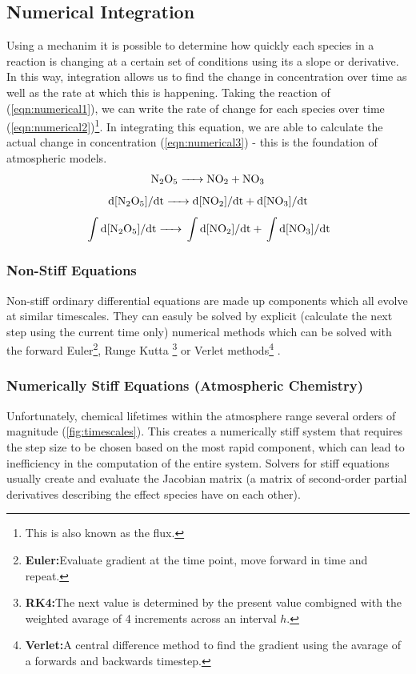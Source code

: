 \subsection{Numerical Integration}
Using a mechanim it is possible to determine how quickly each species in a reaction is changing at a certain set of conditions using its a slope or derivative. In this way, integration allows us to find the change in concentration over time as well as the rate at which this is happening.  Taking the reaction of  (\autoref{eqn:numerical1}), we can write the rate of change for each species over time (\autoref{eqn:numerical2})\footnote{This is also known as the flux.}. In integrating this equation, we are able to calculate the actual change in concentration (\autoref{eqn:numerical3}) - this is the foundation of atmospheric models.
\begin{equation}
\ce{N2O5 ->    NO2} + \ce{NO3}
\label{eqn:numerical1}
\end{equation}
\begin{equation}
\ce{ d[N2O5]/dt ->    d[NO2]/dt} + \ce{d[NO3]/dt}
\label{eqn:numerical2}
\end{equation}
\begin{equation}
\ce{ \int d[N2O5]/dt ->    \int d[NO2]/dt} + \ce{\int d[NO3]/dt}
\label{eqn:numerical3}
\end{equation}
\subsubsection{Non-Stiff Equations}
Non-stiff ordinary differential equations are made up components which all evolve at similar timescales. They can easuly be solved by explicit (calculate the next step using the current time only) numerical methods which can be solved with the forward Euler\footnote{\textbf{Euler:}Evaluate gradient at the time point, move forward in time and repeat.}, Runge Kutta \footnote{\textbf{RK4:}The next value is determined by the present value combigned with the weighted avarage of 4 increments across an interval $h$.} or Verlet methods\footnote{\textbf{Verlet:}A central difference method to find the gradient using the avarage of a forwards and backwards timestep.} \citep{advnummeth,wild}.
\subsubsection{Numerically Stiff Equations (Atmospheric Chemistry)}
Unfortunately, chemical lifetimes within the atmosphere range several orders of magnitude (\autoref{fig:timescales}). This creates a numerically stiff system that requires the step size to be chosen based on the most rapid component, which can lead to inefficiency in the computation of the entire system. Solvers for stiff equations usually create and evaluate the Jacobian matrix (a matrix of second-order partial derivatives describing the effect species have on each other).

